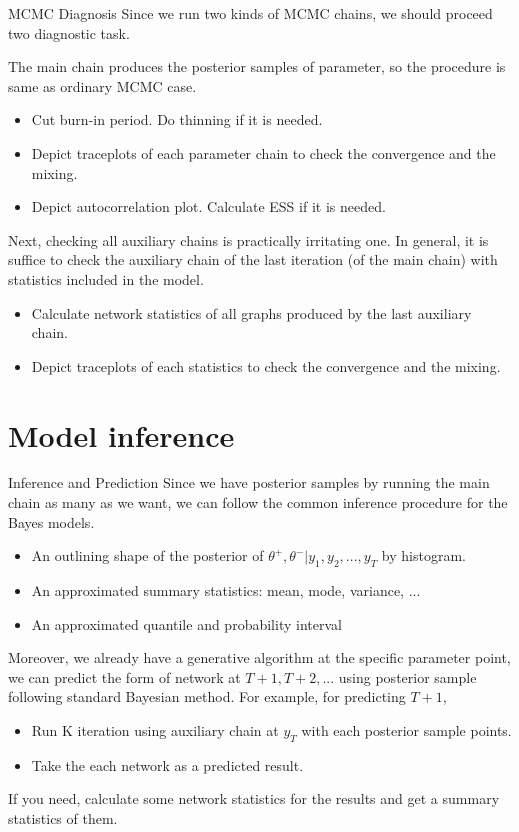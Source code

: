 \documentclass[aspectratio=169,ignorenonframetext,9pt]{beamer}
\theoremstyle{plain}
\theoremstyle{definition}
\begin{document}
\begin{frame}{MCMC Diagnosis}
    Since we run two kinds of MCMC chains, we should proceed two diagnostic task.
    
    The main chain produces the posterior samples of parameter, so the procedure is same as ordinary MCMC case.
    \begin{itemize}
        \item Cut burn-in period. Do thinning if it is needed.
        \item Depict traceplots of each parameter chain to check the convergence and the mixing.
        \item Depict autocorrelation plot. Calculate ESS if it is needed.
    \end{itemize}

    Next, checking all auxiliary chains is practically irritating one. 
    In general, it is suffice to check the auxiliary chain of the last iteration (of the main chain)
    with statistics included in the model.
    \begin{itemize}
        \item Calculate network statistics of all graphs produced by the last auxiliary chain.
        \item Depict traceplots of each statistics to check the convergence and the mixing.
    \end{itemize}
\end{frame}


\section{Model inference}
\begin{frame}{Inference and Prediction}
    Since we have posterior samples by running the main chain as many as we want, we can follow the common inference procedure for the Bayes models.
    \begin{itemize}
        \item An outlining shape of the posterior of $\theta^+,\theta^-|y_1,y_2,...,y_T$ by histogram.
        \item An approximated summary statistics: mean, mode, variance, ...
        \item An approximated quantile and probability interval
    \end{itemize}
    
    Moreover, we already have a generative algorithm at the specific parameter point,
    we can predict the form of network at $T+1,T+2,...$ using posterior sample following standard Bayesian method.
    For example, for predicting $T+1$,
    \begin{itemize}
        \item Run K iteration using auxiliary chain at $y_T$ with each posterior sample points.
        \item Take the each network as a predicted result.
    \end{itemize}
    If you need, calculate some network statistics for the results and get a summary statistics of them.
\end{frame}
\end{document}
